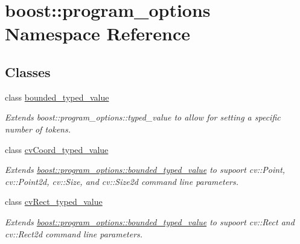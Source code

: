 \hypertarget{namespaceboost_1_1program__options}{}\section{boost\+:\+:program\+\_\+options Namespace Reference}
\label{namespaceboost_1_1program__options}
\subsection*{Classes}
\begin{DoxyCompactItemize}
\item 
class \hyperlink{classboost_1_1program__options_1_1bounded__typed__value}{bounded\+\_\+typed\+\_\+value}
\begin{DoxyCompactList}\small\item\em Extends boost\+::program\+\_\+options\+::typed\+\_\+value to allow for setting a specific number of tokens. \end{DoxyCompactList}\item 
class \hyperlink{structboost_1_1program__options_1_1cv_coord__typed__value}{cv\+Coord\+\_\+typed\+\_\+value}
\begin{DoxyCompactList}\small\item\em Extends \hyperlink{classboost_1_1program__options_1_1bounded__typed__value}{boost\+::program\+\_\+options\+::bounded\+\_\+typed\+\_\+value} to supoort cv\+::\+Point, cv\+::\+Point2d, cv\+::\+Size, and cv\+::\+Size2d command line parameters. \end{DoxyCompactList}\item 
class \hyperlink{structboost_1_1program__options_1_1cv_rect__typed__value}{cv\+Rect\+\_\+typed\+\_\+value}
\begin{DoxyCompactList}\small\item\em Extends \hyperlink{classboost_1_1program__options_1_1bounded__typed__value}{boost\+::program\+\_\+options\+::bounded\+\_\+typed\+\_\+value} to supoort cv\+::\+Rect and cv\+::\+Rect2d command line parameters. \end{DoxyCompactList}\end{DoxyCompactItemize}
